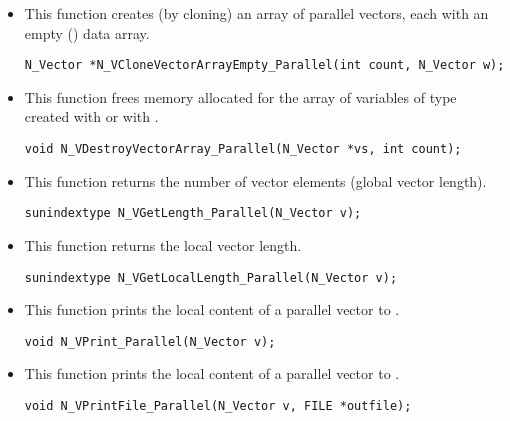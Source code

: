 \begin{itemize}

\item {}
 
  This function creates (by cloning) an array of  parallel vectors,
  each with an empty () data array.
 
\begin{verbatim}
N_Vector *N_VCloneVectorArrayEmpty_Parallel(int count, N_Vector w);
\end{verbatim}


\item {}
 
 This function frees memory allocated for the array of   variables of
 type  created with  or with
 .
 

 \verb|void N_VDestroyVectorArray_Parallel(N_Vector *vs, int count);|



\item {}

 This function returns the number of vector elements (global vector length).

 
 
 \verb|sunindextype N_VGetLength_Parallel(N_Vector v);|


\item {}

 This function returns the local vector length.

 
 
 \verb|sunindextype N_VGetLocalLength_Parallel(N_Vector v);|


\item {}
  
  This function prints the local content of a parallel vector to .
    
  \verb|void N_VPrint_Parallel(N_Vector v);|


\item {}
  
  This function prints the local content of a parallel vector to .
    
  \verb|void N_VPrintFile_Parallel(N_Vector v, FILE *outfile);|


\end{itemize}
